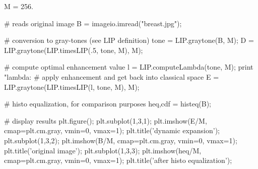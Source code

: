 \begin{python}
M = 256.

# reads original image
B = imageio.imread("breast.jpg");

# conversion to gray-tones (see LIP definition)
tone = LIP.graytone(B, M);
D = LIP.graytone(LIP.timesLIP(.5, tone, M), M);

# compute optimal enhancement value
l = LIP.computeLambda(tone, M);
print "lambda: %
# apply enhancement and get back into classical space
E = LIP.graytone(LIP.timesLIP(l, tone, M), M);

# histo equalization, for comparison purposes
heq,cdf = histeq(B);

# display results
plt.figure();
plt.subplot(1,3,1); plt.imshow(E/M, cmap=plt.cm.gray, vmin=0, vmax=1); plt.title('dynamic expansion');
plt.subplot(1,3,2); plt.imshow(B/M, cmap=plt.cm.gray, vmin=0, vmax=1); plt.title('original image');
plt.subplot(1,3,3); plt.imshow(heq/M, cmap=plt.cm.gray, vmin=0, vmax=1); plt.title('after histo equalization');
\end{python}

